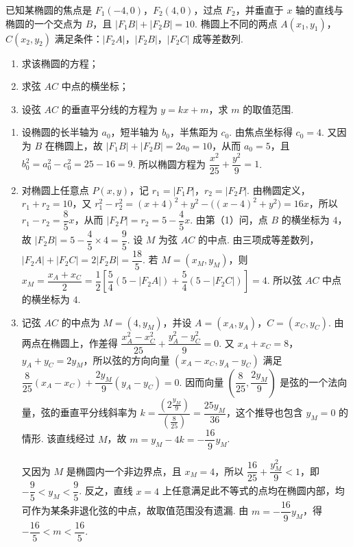 \begin{problem}
已知某椭圆的焦点是 \(F_1(-4,0)\)，\(F_2(4,0)\)，过点 \(F_2\)，并垂直于 \(x\) 轴的直线与椭圆的一个交点为 \(B\)，且 \(\lvert F_1B\rvert+\lvert F_2B\rvert=10\). 椭圆上不同的两点 \(A(x_1,y_1)\)，\(C(x_2,y_2)\) 满足条件：\(\lvert F_2A\rvert\)，\(\lvert F_2B\rvert\)，\(\lvert F_2C\rvert\) 成等差数列.
\begin{enumerate}
\item 求该椭圆的方程；
\item 求弦 \(AC\) 中点的横坐标；
\item 设弦 \(AC\) 的垂直平分线的方程为 \(y=kx+m\)，求 \(m\) 的取值范围.
\end{enumerate}

\begin{solution}
\begin{enumerate}
\item 设椭圆的长半轴为 \(a_{0}\)，短半轴为 \(b_{0}\)，半焦距为 \(c_{0}\). 由焦点坐标得 \(c_{0}=4\). 又因为 \(B\) 在椭圆上，故 \(\lvert F_{1}B\rvert+\lvert F_{2}B\rvert=2a_{0}=10\)，从而 \(a_{0}=5\)，且 \(b_{0}^{2}=a_{0}^{2}-c_{0}^{2}=25-16=9\). 所以椭圆方程为 \(\dfrac{x^{2}}{25}+\dfrac{y^{2}}{9}=1\).
\item 对椭圆上任意点 \(P(x,y)\)，记 \(r_{1}=\lvert F_{1}P\rvert\)，\(r_{2}=\lvert F_{2}P\rvert\). 由椭圆定义，\(r_{1}+r_{2}=10\)，又 \(r_{1}^{2}-r_{2}^{2}=(x+4)^{2}+y^{2}-\bigl((x-4)^{2}+y^{2}\bigr)=16x\)，所以 \(r_{1}-r_{2}=\dfrac{8}{5}x\)，从而 \(\lvert F_{2}P\rvert=r_{2}=5-\dfrac45x\). 由第（1）问，点 \(B\) 的横坐标为 \(4\)，故 \(\lvert F_{2}B\rvert=5-\dfrac45\times4=\dfrac95\). 设 \(M\) 为弦 \(AC\) 的中点. 由三项成等差数列，\(\lvert F_{2}A\rvert+\lvert F_{2}C\rvert=2\lvert F_{2}B\rvert=\dfrac{18}{5}\). 若 \(M=(x_{M},y_{M})\)，则 \(x_{M}=\dfrac{x_{A}+x_{C}}{2}=\dfrac{1}{2}\left[\dfrac54\left(5-\lvert F_{2}A\rvert\right)+\dfrac54\left(5-\lvert F_{2}C\rvert\right)\right]=4\). 所以弦 \(AC\) 中点的横坐标为 \(4\).
\item 记弦 \(AC\) 的中点为 \(M=(4,y_{M})\)，并设 \(A=(x_{A},y_{A})\)，\(C=(x_{C},y_{C})\). 由两点在椭圆上，作差得 \(\dfrac{x_{A}^{2}-x_{C}^{2}}{25}+\dfrac{y_{A}^{2}-y_{C}^{2}}{9}=0\). 又 \(x_{A}+x_{C}=8\)，\(y_{A}+y_{C}=2y_{M}\)，所以弦的方向向量 \((x_{A}-x_{C},y_{A}-y_{C})\) 满足 \(\dfrac{8}{25}(x_{A}-x_{C})+\dfrac{2y_{M}}{9}(y_{A}-y_{C})=0\). 因而向量 \(\left(\dfrac{8}{25},\dfrac{2y_{M}}{9}\right)\) 是弦的一个法向量，弦的垂直平分线斜率为 \(k=\dfrac{(2\frac{y_{M}}{9})}{(\frac{8}{25})}=\dfrac{25y_{M}}{36}\)，这个推导也包含 \(y_{M}=0\) 的情形. 该直线经过 \(M\)，故 \(m=y_{M}-4k=-\dfrac{16}{9}y_{M}\).

又因为 \(M\) 是椭圆内一个非边界点，且 \(x_{M}=4\)，所以 \(\dfrac{16}{25}+\dfrac{y_{M}^{2}}{9}<1\)，即 \(-\dfrac95<y_{M}<\dfrac95\). 反之，直线 \(x=4\) 上任意满足此不等式的点均在椭圆内部，均可作为某条非退化弦的中点，故取值范围没有遗漏. 由 \(m=-\dfrac{16}{9}y_{M}\)，得 \(-\dfrac{16}{5}<m<\dfrac{16}{5}\).
\end{enumerate}
\end{solution}
\end{problem}

